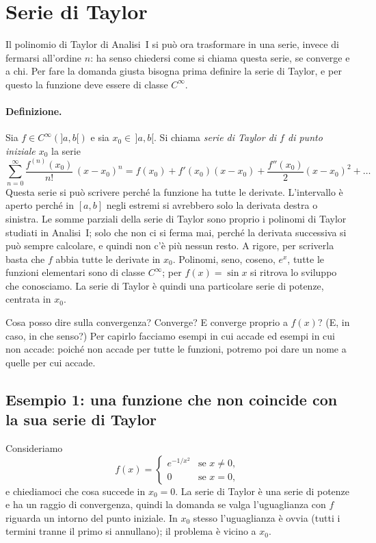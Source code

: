 \section{Serie di Taylor}

Il polinomio di Taylor di Analisi~I si può ora trasformare in una serie, invece di fermarsi all'ordine $n$: ha
senso chiedersi come si chiama questa serie, se converge e a chi. Per fare la domanda giusta bisogna prima
definire la serie di Taylor, e per questo la funzione deve essere di classe $C^\infty$.

\paragraph{Definizione.}
Sia $f\in C^\infty(]a,b[)$ e sia $x_0\in\,]a,b[$. Si chiama \emph{serie di Taylor di $f$ di punto iniziale
$x_0$} la serie
\[
  \sum_{n=0}^{\infty} \frac{f^{(n)}(x_0)}{n!}\,(x-x_0)^n
  = f(x_0) + f'(x_0)(x-x_0) + \frac{f''(x_0)}{2}(x-x_0)^2 + \dots
\]
Questa serie si può scrivere perché la funzione ha tutte le derivate.
L'intervallo è aperto perché in $[a,b]$ negli estremi si avrebbero solo la derivata destra o sinistra.
Le somme parziali della serie di Taylor sono proprio i polinomi di Taylor studiati in Analisi~I; solo che non
ci si ferma mai, perché la derivata successiva si può sempre calcolare, e quindi non c'è più nessun resto. A
rigore, per scriverla basta che $f$ abbia tutte le derivate in $x_0$. Polinomi, seno, coseno, $e^x$, tutte le
funzioni elementari sono di classe $C^\infty$; per $f(x)=\sin x$ si ritrova lo sviluppo che conosciamo.
La serie di Taylor è quindi una particolare serie di potenze, centrata in $x_0$.

Cosa posso dire sulla convergenza? Converge? E converge proprio a $f(x)$?
(E, in caso, in che senso?) Per capirlo facciamo esempi in cui accade ed esempi in cui non accade: poiché non
accade per tutte le funzioni, potremo poi dare un nome a quelle per cui accade.

\subsection{Esempio 1: una funzione che non coincide con la sua serie di Taylor}

Consideriamo
\[
  f(x) = \begin{cases} e^{-1/x^2} & \text{se } x\neq 0,\\ 0 & \text{se } x=0, \end{cases}
\]
e chiediamoci che cosa succede in $x_0=0$.
La serie di Taylor è una serie di potenze e ha un raggio di convergenza, quindi la domanda se valga l'uguaglianza
con $f$ riguarda un intorno del punto iniziale. In $x_0$ stesso l'uguaglianza è ovvia (tutti i termini tranne il
primo si annullano); il problema è vicino a $x_0$.

